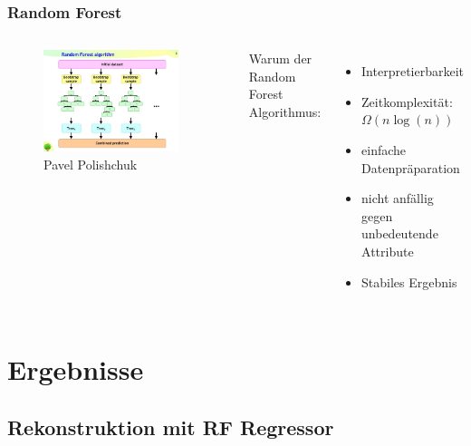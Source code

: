 \documentclass[aspectratio=1610, professionalfonts, 9pt]{beamer}
\begin{document}
  \begin{frame}
    \frametitle{Random Forest}
    \begin{columns}
      \begin{figure}
        \includegraphics[width=0.9\textwidth]{pictures/RF.jpg}
        \caption{Pavel Polishchuk}
        \label{abb:RF}
      \end{figure}
      Warum der Random Forest Algorithmus:
      \begin{itemize}
        \item Interpretierbarkeit
        \item Zeitkomplexität: $\Omega(n\log(n))$
        \item einfache Datenpräparation
        \item nicht anfällig gegen unbedeutende Attribute
        \item Stabiles Ergebnis
      \end{itemize}
    \end{columns}
  \end{frame}

  \section{Ergebnisse}
  \subsection{Rekonstruktion mit RF Regressor}
\end{document}
